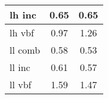 \documentclass{beamer}
\begin{document}
\begin{frame}
\begin{normalsize}
\begin{minipage}{\textwidth}
\begin{minipage}[c]{0.19\textwidth}
\begin{table}
{{\begin{tabular}{| l | c | c |}
lh inc     &     0.65          &     0.65          \\\hline
lh vbf     &     0.97         &        1.26	       \\\hline
ll comb     &      0.58         &  0.53	             \\\hline
ll inc     &      0.61        &     0.57          \\\hline
ll vbf     &       1.59        &     1.47          \\\hline
\end{tabular}
}}
\end{table}
\end{minipage}
\end{minipage}
\end{normalsize}
\end{frame}
\end{document}
